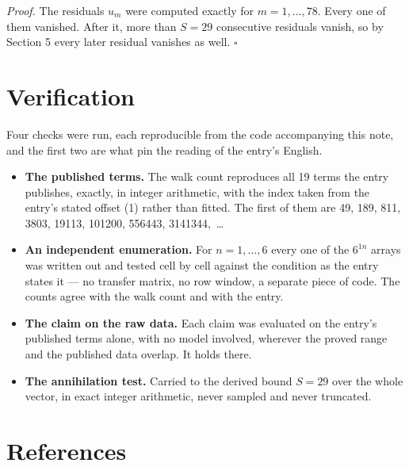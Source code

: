 \documentclass[11pt]{article}
\theoremstyle{definition}
\begin{document}
{\itshape Proof.} The residuals $u_m$ were computed exactly for $m = 1,\dots,78$. Every one of them vanished. After it, more than $S = 29$ consecutive residuals vanish, so by Section 5 every later residual vanishes as well. $\square$

\section{Verification}

Four checks were run, each reproducible from the code accompanying this note, and the first two are what pin the reading of the entry's English.

\begin{itemize}

\item {\bfseries The published terms.} The walk count reproduces all 19 terms the entry publishes, exactly, in integer arithmetic, with the index taken from the entry's stated offset (1) rather than fitted. The first of them are 49, 189, 811, 3803, 19113, 101200, 556443, 3141344,~\dots

\item {\bfseries An independent enumeration.} For $n = 1,\dots,6$ every one of the $6^{1n}$ arrays was written out and tested cell by cell against the condition as the entry states it --- no transfer matrix, no row window, a separate piece of code. The counts agree with the walk count and with the entry.

\item {\bfseries The claim on the raw data.} Each claim was evaluated on the entry's published terms alone, with no model involved, wherever the proved range and the published data overlap. It holds there.

\item {\bfseries The annihilation test.} Carried to the derived bound $S = 29$ over the whole vector, in exact integer arithmetic, never sampled and never truncated.

\end{itemize}

\section{References}
\end{document}
